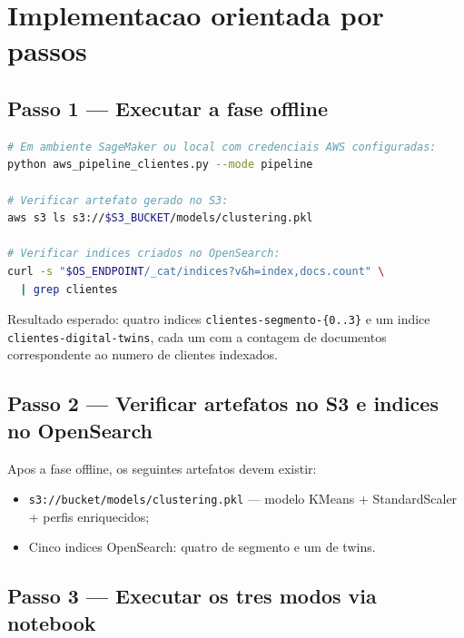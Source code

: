 \section{Implementacao orientada por passos}

\subsection{Passo 1 --- Executar a fase offline}

\begin{lstlisting}[language=bash,
  caption={Execucao do pipeline offline para gerar indices e modelo.},
  label={lst:pipeline_offline}]
# Em ambiente SageMaker ou local com credenciais AWS configuradas:
python aws_pipeline_clientes.py --mode pipeline

# Verificar artefato gerado no S3:
aws s3 ls s3://$S3_BUCKET/models/clustering.pkl

# Verificar indices criados no OpenSearch:
curl -s "$OS_ENDPOINT/_cat/indices?v&h=index,docs.count" \
  | grep clientes
\end{lstlisting}

Resultado esperado: quatro indices \texttt{clientes-segmento-\{0..3\}}
e um indice \texttt{clientes-digital-twins}, cada um com a contagem de
documentos correspondente ao numero de clientes indexados.

\subsection{Passo 2 --- Verificar artefatos no S3 e indices no OpenSearch}

Apos a fase offline, os seguintes artefatos devem existir:

\begin{itemize}[leftmargin=*]
  \item \texttt{s3://bucket/models/clustering.pkl} --- modelo KMeans +
        StandardScaler + perfis enriquecidos;
  \item Cinco indices OpenSearch: quatro de segmento e um de twins.
\end{itemize}

\subsection{Passo 3 --- Executar os tres modos via notebook}

